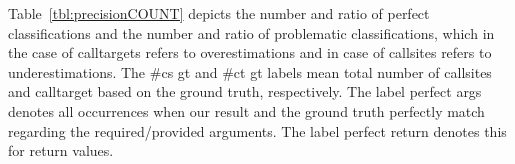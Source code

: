\texttt{}
\begin{table}[H]

\caption {The results for classification of callsites and calltargets using our \textit{count} policy on the \texttt{-O2} optimization level, when comparing to the ground truth obtained by our Clang/LLVM pass.
                }
\label{tbl:precisionCOUNT}
\vspace{-.5cm}
\end{table}
Table~\ref{tbl:precisionCOUNT} depicts the number and ratio of perfect 
classifications and the number and ratio of problematic classifications, which in the case of calltargets refers to overestimations and in case of callsites refers to underestimations.
The \#cs gt and \#ct gt labels mean total number of callsites and calltarget based on the ground truth, respectively.
The label perfect args denotes all occurrences when our result and the ground truth perfectly match regarding the required/provided arguments. The label perfect return denotes this for return values. 

